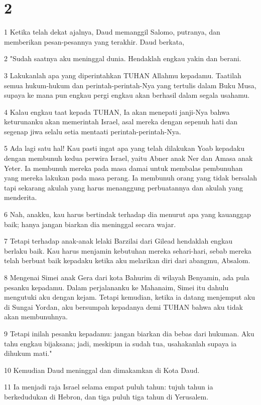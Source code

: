 \chapter{2}

\par 1 Ketika telah dekat ajalnya, Daud memanggil Salomo, putranya, dan memberikan pesan-pesannya yang terakhir. Daud berkata,
\par 2 "Sudah saatnya aku meninggal dunia. Hendaklah engkau yakin dan berani.
\par 3 Lakukanlah apa yang diperintahkan TUHAN Allahmu kepadamu. Taatilah semua hukum-hukum dan perintah-perintah-Nya yang tertulis dalam Buku Musa, supaya ke mana pun engkau pergi engkau akan berhasil dalam segala usahamu.
\par 4 Kalau engkau taat kepada TUHAN, Ia akan menepati janji-Nya bahwa keturunanku akan memerintah Israel, asal mereka dengan sepenuh hati dan segenap jiwa selalu setia mentaati perintah-perintah-Nya.
\par 5 Ada lagi satu hal! Kau pasti ingat apa yang telah dilakukan Yoab kepadaku dengan membunuh kedua perwira Israel, yaitu Abner anak Ner dan Amasa anak Yeter. Ia membunuh mereka pada masa damai untuk membalas pembunuhan yang mereka lakukan pada masa perang. Ia membunuh orang yang tidak bersalah tapi sekarang akulah yang harus menanggung perbuatannya dan akulah yang menderita.
\par 6 Nah, anakku, kau harus bertindak terhadap dia menurut apa yang kauanggap baik; hanya jangan biarkan dia meninggal secara wajar.
\par 7 Tetapi terhadap anak-anak lelaki Barzilai dari Gilead hendaklah engkau berlaku baik. Kau harus menjamin kebutuhan mereka sehari-hari, sebab mereka telah berbuat baik kepadaku ketika aku melarikan diri dari abangmu, Absalom.
\par 8 Mengenai Simei anak Gera dari kota Bahurim di wilayah Benyamin, ada pula pesanku kepadamu. Dalam perjalananku ke Mahanaim, Simei itu dahulu mengutuki aku dengan kejam. Tetapi kemudian, ketika ia datang menjemput aku di Sungai Yordan, aku bersumpah kepadanya demi TUHAN bahwa aku tidak akan membunuhnya.
\par 9 Tetapi inilah pesanku kepadamu: jangan biarkan dia bebas dari hukuman. Aku tahu engkau bijaksana; jadi, meskipun ia sudah tua, usahakanlah supaya ia dihukum mati."
\par 10 Kemudian Daud meninggal dan dimakamkan di Kota Daud.
\par 11 Ia menjadi raja Israel selama empat puluh tahun: tujuh tahun ia berkedudukan di Hebron, dan tiga puluh tiga tahun di Yerusalem.
